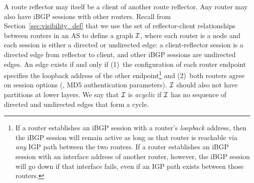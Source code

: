 A route reflector may itself be a client of another route reflector.
Any router may also have iBGP sessions with other routers.
Recall from Section~\ref{sec:visibility_def} that we use the set of
reflector-client relationships between routers in an AS to define a 
graph $\mathcal{I}$, where each router is a node and each
session is either a directed or undirected edge: a client-reflector
session is a directed edge from 
reflector to client, and other iBGP sessions are undirected edges.  An
edge exists if and only if (1)~the configuration of each router endpoint
specifies the loopback address of the other endpoint\footnote{If a
router establishes an iBGP session with a router's {\em loopback} address,
then the iBGP session will remain active as long as that router is
reachable via {\em any} IGP path between the two routers.  If a router
establishes an iBGP session with an interface address of another router,
however, the iBGP session will go down if that interface fails, even if
an IGP path exists between those routers.} and (2)~both routers agree
on session options (\eg, MD5 authentication parameters).  $\mathcal{I}$
should also not have partitions at lower layers.  We say that $\mathcal{I}$ is
{\em acyclic} if $\mathcal{I}$ has no sequence of directed and undirected edges
that form a cycle.  


